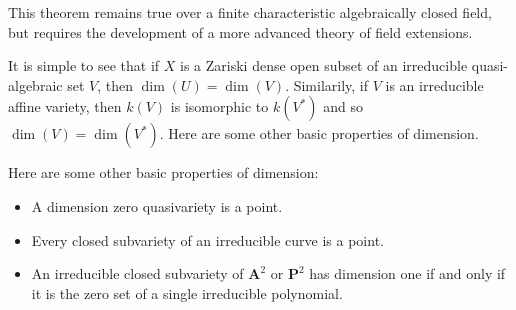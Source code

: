 \begin{remark}
    This theorem remains true over a finite characteristic algebraically closed field, but requires the development of a more advanced theory of field extensions.
\end{remark}

It is simple to see that if $X$ is a Zariski dense open subset of an irreducible quasi-algebraic set $V$, then $\dim(U) = \dim(V)$. Similarily, if $V$ is an irreducible affine variety, then $k(V)$ is isomorphic to $k(V^*)$ and so $\dim(V) = \dim(V^*)$. Here are some other basic properties of dimension.

\begin{theorem}
    Here are some other basic properties of dimension:
    \begin{itemize}
        \item A dimension zero quasivariety is a point.
        \item Every closed subvariety of an irreducible curve is a point.
        \item An irreducible closed subvariety of $\mathbf{A}^2$ or $\mathbf{P}^2$ has dimension one if and only if it is the zero set of a single irreducible polynomial.
    \end{itemize}
\end{theorem}
